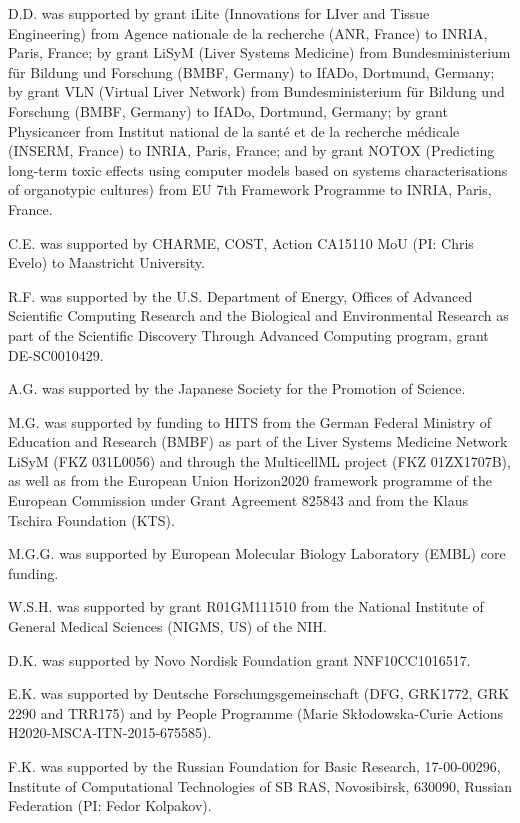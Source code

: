 \documentclass{sbml-paper}
\begin{document}
D.D. was supported by grant iLite (Innovations for LIver and Tissue Engineering) from Agence nationale de la recherche (ANR, France) to INRIA, Paris, France; by grant LiSyM (Liver Systems Medicine) from Bundesministerium für Bildung und Forschung (BMBF, Germany) to IfADo, Dortmund, Germany; by grant VLN (Virtual Liver Network) from Bundesministerium für Bildung und Forschung (BMBF, Germany) to IfADo, Dortmund, Germany; by grant Physicancer from Institut national de la santé et de la recherche médicale (INSERM, France) to INRIA, Paris, France; and by grant NOTOX (Predicting long-term toxic effects using computer models based on systems characterisations of organotypic cultures) from EU 7th Framework Programme to INRIA, Paris, France.

C.E. was supported by CHARME, COST, Action CA15110 MoU (PI: Chris Evelo) to Maastricht University.

R.F. was supported by the U.S. Department of Energy, Offices of Advanced Scientific Computing Research and the Biological and Environmental Research as part of the Scientific Discovery Through Advanced Computing program, grant \No DE-SC0010429.

A.G. was supported by the Japanese Society for the Promotion of Science.

M.G. was supported by funding to HITS from the German Federal Ministry of Education and Research (BMBF) as part of the Liver Systems Medicine Network LiSyM (FKZ 031L0056) and through the MulticellML project (FKZ 01ZX1707B), as well as from the European Union Horizon2020 framework programme of the European Commission under Grant Agreement 825843 and from the Klaus Tschira Foundation (KTS).

M.G.G. was supported by European Molecular Biology Laboratory (EMBL) core funding.

W.S.H. was supported by grant \No R01GM111510 from the National Institute of General Medical Sciences (NIGMS, US) of the NIH.

D.K. was supported by Novo Nordisk Foundation grant \No NNF10CC1016517.

E.K. was supported by Deutsche Forschungsgemeinschaft (DFG, GRK1772, GRK 2290 and TRR175) and by People Programme (Marie Skłodowska-Curie Actions H2020-MSCA-ITN-2015-675585).

F.K. was supported by the Russian Foundation for Basic Research, 17-00-00296, Institute of Computational Technologies of SB RAS, Novosibirsk, 630090, Russian Federation (PI: Fedor Kolpakov).
\end{document}
